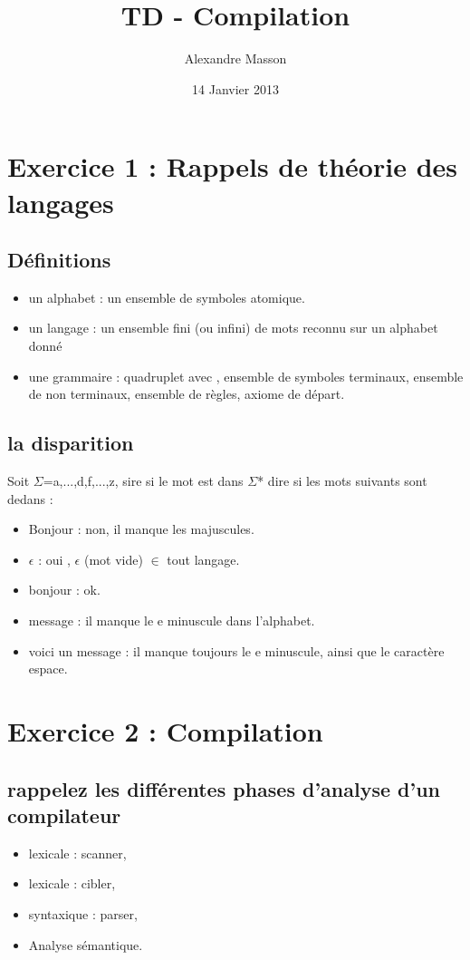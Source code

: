 \documentclass{article}
\title{TD - Compilation}
\author{Alexandre Masson}
\date{14 Janvier 2013}
\begin{document}
\maketitle
\newpage
\tableofcontents
\newpage
\section{Exercice 1 : Rappels de théorie des langages}
\subsection{Définitions}
\begin{itemize}

\item un alphabet : un ensemble de symboles atomique.
\item un langage : un ensemble fini (ou infini) de mots reconnu sur un alphabet donné
\item une grammaire : quadruplet avec , ensemble de symboles terminaux, ensemble de non terminaux, ensemble de règles, axiome de départ.

\end{itemize}

\subsection{la disparition} 
Soit $\Sigma$={a,...,d,f,...,z}, sire si le mot est dans $\Sigma$* dire si les mots suivants sont dedans : 
\begin{itemize}
\item Bonjour : non, il manque les majuscules.
\item $\epsilon$ : oui , $\epsilon$ (mot vide) $\in$ tout langage.
\item bonjour : ok.
\item message : il manque le e minuscule dans l'alphabet.
\item voici un message : il manque toujours le e minuscule, ainsi que le caractère espace.
\end{itemize}

\section{Exercice 2 : Compilation}
\subsection{rappelez les différentes phases d'analyse d'un compilateur}
\begin{itemize}
\item lexicale : scanner,
\item lexicale : cibler,
\item syntaxique : parser,
\item Analyse sémantique.
\end{itemize}
\end{document}
